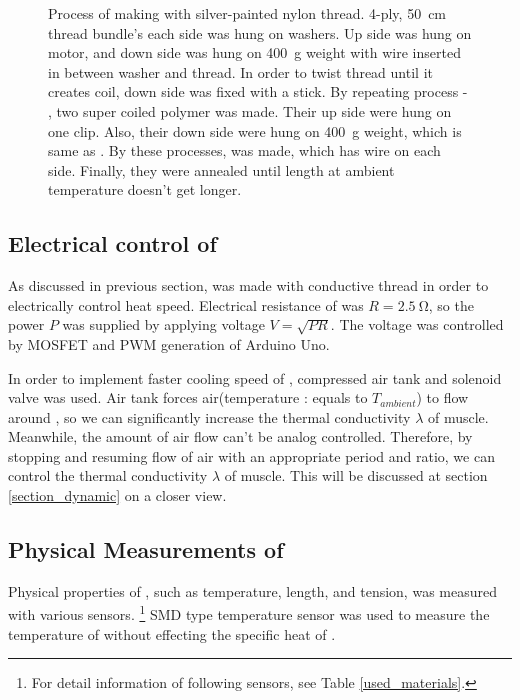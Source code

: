 \begin{figure}
	\caption[Process of making \scp with silver-painted nylon thread]{Process of making \scp with silver-painted nylon thread.  4-ply, \SI{50}{\centi\meter} thread bundle's each side was hung on washers.  Up side was hung on motor, and down side was hung on \SI{400}{\gram} weight with wire inserted in between washer and thread.  In order to twist thread until it creates coil, down side was fixed with a stick.  By repeating process  - , two super coiled polymer was made. Their up side were hung on one clip. Also, their down side were hung on \SI{400}{\gram} weight, which is same as .  By these processes, \scp was made, which has wire on each side.  Finally, they were annealed until length at ambient temperature doesn't get longer.}
	\label{silverSCP_makingof}
\end{figure}

\subsection{Electrical control of \scp}\label{section_electrical_control}
As discussed in previous section, \scp was made with conductive thread in order to electrically control heat speed. Electrical resistance of \scp was $R=\SI{2.5}{\ohm}$, so the power $P$ was supplied by applying voltage $V=\sqrt{PR}$. The voltage was controlled by MOSFET and PWM generation of Arduino Uno.

In order to implement faster cooling speed of \scp, compressed air tank and solenoid valve was used. Air tank forces air(temperature : equals to  $T_{ambient}$) to flow around \scp, so we can significantly increase the thermal conductivity $\lambda$ of muscle. Meanwhile, the amount of air flow can't be analog controlled. Therefore, by stopping and resuming flow of air with an appropriate period and ratio, we can control the thermal conductivity $\lambda$ of muscle. This will be discussed at section \ref{section_dynamic} on a closer view.

\subsection{Physical Measurements of \scp}
Physical properties of \scp, such as temperature, length, and tension, was measured with various sensors.
\footnote{For detail information of following sensors, see Table \ref{used_materials}.}
SMD type temperature sensor was used to measure the temperature of \scp without effecting the specific heat of \scp.


